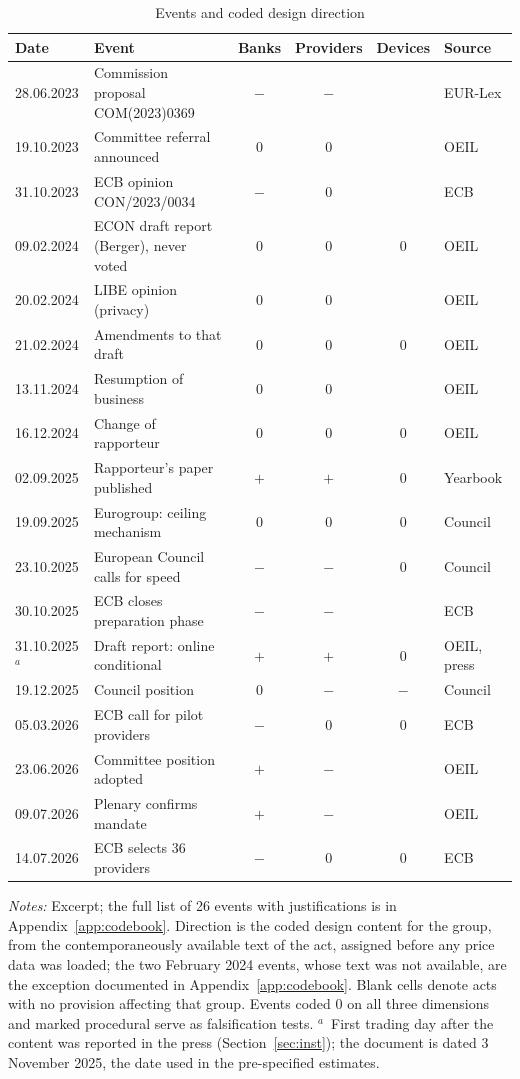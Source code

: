 \documentclass[11pt]{article}
\theoremstyle{plain}\newtheorem{proposition}{Proposition}
\begin{document}
\begin{table}[t]\centering\small
\begin{threeparttable}
\caption{Events and coded design direction}\label{tab:events}
\begin{tabular}{llccc l}
\toprule
Date & Event & Banks & Providers & Devices & Source \\
\midrule
28.06.2023 & Commission proposal COM(2023)0369 & $-$ & $-$ & & EUR-Lex \\
19.10.2023 & Committee referral announced & $0$ & $0$ & & OEIL \\
31.10.2023 & ECB opinion CON/2023/0034 & $-$ & $0$ & & ECB \\
09.02.2024 & ECON draft report (Berger), never voted & $0$ & $0$ & $0$ & OEIL \\
20.02.2024 & LIBE opinion (privacy) & $0$ & $0$ & & OEIL \\
21.02.2024 & Amendments to that draft & $0$ & $0$ & $0$ & OEIL \\
13.11.2024 & Resumption of business & $0$ & $0$ & & OEIL \\
16.12.2024 & Change of rapporteur & $0$ & $0$ & $0$ & OEIL \\
02.09.2025 & Rapporteur's paper published & $+$ & $+$ & $0$ & Yearbook \\
19.09.2025 & Eurogroup: ceiling mechanism & $0$ & $0$ & $0$ & Council \\
23.10.2025 & European Council calls for speed & $-$ & $-$ & $0$ & Council \\
30.10.2025 & ECB closes preparation phase & $-$ & $-$ & & ECB \\
31.10.2025$^{a}$ & Draft report: online conditional & $+$ & $+$ & $0$ & OEIL, press \\
19.12.2025 & Council position & $0$ & $-$ & $-$ & Council \\
05.03.2026 & ECB call for pilot providers & $-$ & $0$ & $0$ & ECB \\
23.06.2026 & Committee position adopted & $+$ & $-$ & & OEIL \\
09.07.2026 & Plenary confirms mandate & $+$ & $-$ & & OEIL \\
14.07.2026 & ECB selects 36 providers & $-$ & $0$ & $0$ & ECB \\
\bottomrule
\end{tabular}
\begin{tablenotes}\footnotesize
\item \textit{Notes:} Excerpt; the full list of 26 events with justifications is in Appendix~\ref{app:codebook}. Direction is the coded design content for the group, from the contemporaneously available text of the act, assigned before any price data was loaded; the two February 2024 events, whose text was not available, are the exception documented in Appendix~\ref{app:codebook}. Blank cells denote acts with no provision affecting that group. Events coded $0$ on all three dimensions and marked procedural serve as falsification tests. $^{a}$~First trading day after the content was reported in the press (Section~\ref{sec:inst}); the document is dated 3 November 2025, the date used in the pre-specified estimates. \end{tablenotes}

\end{threeparttable}
\end{table}
\end{document}
